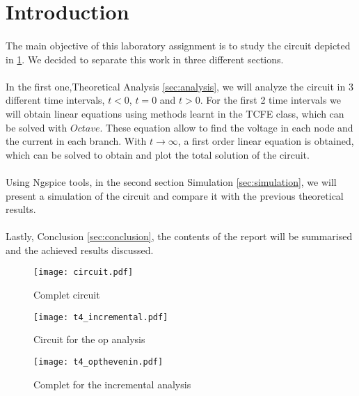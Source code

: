 \newpage
\section{Introduction}
\label{sec:introduction}

\paragraph{} The main objective of this laboratory assignment is to study the circuit depicted in \ref{fig:circuit}. We decided to
separate this work in three different sections. \paragraph{}
In the first one,Theoretical Analysis \ref{sec:analysis}, we will analyze the circuit in 3 different
time intervals, $t<0$, $t=0$ and $t>0$. For the first 2 time intervals we will obtain linear equations using methods learnt in the TCFE class,
which can be solved with $Octave$. These equation allow to find the voltage in each node and the current
in each branch. With $t \rightarrow \infty $, a first order linear equation is obtained, which can be solved to obtain and plot the total solution of
the circuit. \paragraph{}
Using Ngspice tools, in the second section Simulation \ref{sec:simulation}, we will present a simulation of the circuit
and compare it with the previous theoretical results. \paragraph{}
Lastly, Conclusion \ref{sec:conclusion}, the contents of the report will be summarised and the achieved results discussed.

\begin{figure}[h]
    \centering
    \texttt{[image: circuit.pdf]}
    \caption{Complet circuit}
    \label{fig:circuit}
\end{figure}

\begin{figure}[h]
    \centering
    \texttt{[image: t4\_incremental.pdf]}
    \caption{Circuit for the op analysis}
    \label{fig:op_circuit}
\end{figure}

\begin{figure}[h]
    \centering
    \texttt{[image: t4\_opthevenin.pdf]}
    \caption{Complet for the incremental analysis}
    \label{fig:inc_circuit}
\end{figure}

